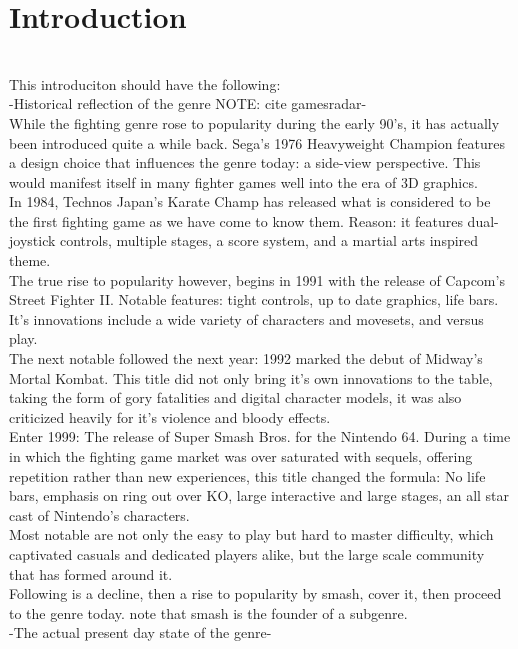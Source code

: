 \documentclass[11pt]{article}
\begin{document}
\chapter{Introduction}\\
This introduciton should have the following:\\
-Historical reflection of the genre NOTE: cite gamesradar-\\
While the fighting genre rose to popularity during the early 90's, it has actually been introduced quite a while back. Sega's 1976 Heavyweight Champion features a design choice that influences the genre today: a side-view perspective. This would manifest itself in many fighter games well into the era of 3D graphics.\\
In 1984, Technos Japan's Karate Champ has released what is considered to be the first fighting game as we have come to know them. Reason: it features dual-joystick controls, multiple stages, a score system, and a martial arts inspired theme.\\
The true rise to popularity however, begins in 1991 with the release of Capcom's Street Fighter II. Notable features: tight controls, up to date graphics, life bars. It's innovations include a wide variety of characters and movesets, and versus play.\\
The next notable followed the next year: 1992 marked the debut of Midway's Mortal Kombat. This title did not only bring it's own innovations to the table, taking the form of gory fatalities and digital character models, it was also criticized heavily for it's violence and bloody effects.\\
Enter 1999: The release of Super Smash Bros. for the Nintendo 64. During a time in which the fighting game market was over saturated with sequels, offering repetition rather than new experiences, this title changed the formula: No life bars, emphasis on ring out over KO, large interactive and large stages, an all star cast of Nintendo's characters.\\
Most notable are not only the easy to play but hard to master difficulty, which captivated casuals and dedicated players alike, but the large scale community that has formed around it.\\
Following is a decline, then a rise to popularity by smash, cover it, then proceed to the genre today. note that smash is the founder of a subgenre.\\
-The actual present day state of the genre-\\
\end{document}
